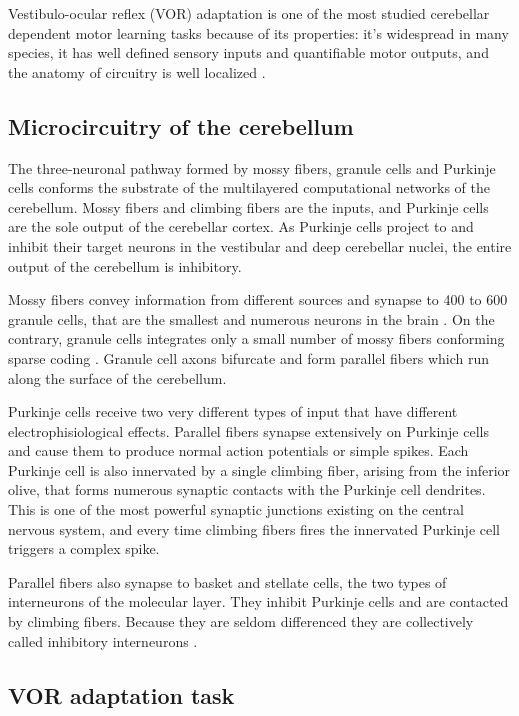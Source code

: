 \documentclass[12pt, a4paper,twoside]{tesi_upf}
\begin{document}
Vestibulo-ocular reflex (VOR) adaptation is one of the most studied cerebellar dependent motor learning tasks because of its properties: it's widespread in many species, it has well defined sensory inputs and quantifiable motor outputs, and the anatomy of circuitry is well localized \cite{Ito1982}.

\subsection{Microcircuitry of the cerebellum}

The three-neuronal pathway formed by mossy fibers, granule cells and Purkinje cells conforms the substrate of the multilayered computational networks of the cerebellum. Mossy fibers and climbing fibers are the inputs, and Purkinje cells are the sole output of the cerebellar cortex. As Purkinje cells project to and inhibit their target neurons in the vestibular and deep cerebellar nuclei, the entire output of the cerebellum is inhibitory.

Mossy fibers convey information from different sources and synapse to 400 to 600 granule cells, that are the smallest and numerous neurons in the brain \cite{Marr1969}. On the contrary, granule cells integrates only a small number of mossy fibers conforming sparse coding \cite{Ito2006}. Granule cell axons bifurcate and form parallel fibers which run along the surface of the cerebellum.

Purkinje cells receive two very different types of input that have different electrophisiological effects. Parallel fibers synapse extensively on Purkinje cells and cause them to produce normal action potentials or simple spikes. Each Purkinje cell is also innervated by a single climbing fiber, arising from the inferior olive, that forms numerous synaptic contacts with the Purkinje cell dendrites. This is one of the most powerful synaptic junctions existing on the central nervous system, and every time climbing fibers fires the innervated Purkinje cell triggers a complex spike.

Parallel fibers also synapse to basket and stellate cells, the two types of interneurons of the molecular layer. They inhibit Purkinje cells and are contacted by climbing fibers. Because they are seldom differenced they are collectively called inhibitory interneurons \cite{Jorntell2010}.

\subsection{VOR adaptation task}
\end{document}
